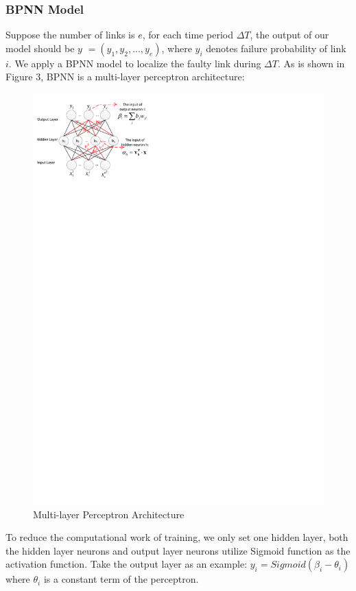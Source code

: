 \documentclass{sig-alternate-05-2015}
\begin{document}
\subsubsection*{BPNN Model}
\quad Suppose the number of links is $e$, for each time period $\Delta T$, the output of our model should be
\boldmath $y$
\unboldmath $=(y_1, y_2, ..., y_e)$, where $y_i$ denotes failure probability of link $i$. We apply a BPNN model to localize the faulty link during $\Delta T$. As is shown in Figure 3, BPNN is a multi-layer perceptron architecture:
\begin{figure}[t]
  \centering
  \includegraphics{ANN}
  \caption{Multi-layer Perceptron Architecture}
\end{figure}
To reduce the computational work of training, we only set one hidden layer, both the hidden layer neurons and output layer neurons utilize Sigmoid function as the activation function. Take the output layer as an example:
$y_i = Sigmoid(\beta_i - \theta_i)$ where $\theta_i$ is a constant term of the perceptron.
\end{document}
